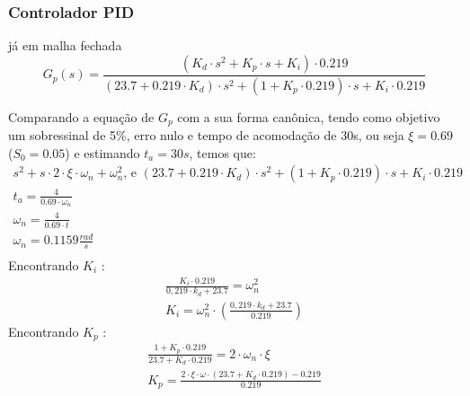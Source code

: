 \documentclass[
	article,			%
	11pt,				%
	oneside,			%
	a4paper,			%
	section=TITLE,		%
	english,			%
	brazil,				%
	sumario=tradicional
	]{abntex2}
\begin{document}
\subsubsection{Controlador PID}
 já em malha fechada
\begin{equation}
     G_p(s) = \frac{ (K_d \cdot s^2 + K_p \cdot s + K_i) \cdot 0.219 }{(23.7 + 0.219 \cdot K_d) \cdot s^2 + (1 + K_p \cdot 0.219) \cdot s  + K_i \cdot 0.219}
     \label{eq:planta-com-pi}
\end{equation}

    
    Comparando a equação de $G_p$ com a sua forma canônica, tendo como objetivo um sobressinal de 5\%, erro nulo e tempo de acomodação de 30s, ou seja $\xi = 0.69$ ($S_0 = 0.05$) e estimando $t_a = 30s$, temos que:
    \begin{equation} \begin{split}
        s^2 + s \cdot 2 \cdot \xi \cdot \omega_n + \omega_n^2  \text{, e   } %
        (23.7 + 0.219 \cdot K_d) \cdot s^2 + (1 + K_p \cdot 0.219) \cdot s  + K_i \cdot 0.219 \\
        t_a = \frac{4}{0.69 \cdot \omega_n} \\
        \omega_n = \frac{4}{0.69 \cdot t} \\
        \omega_n = 0.1159 \frac{rad}{s} \\
    \end{split} \end{equation}
    Encontrando $K_i$ : 
    \begin{equation} \begin{split}
        \frac{K_i \cdot 0.219}{0,219 \cdot k_d + 23.7} = \omega_n^2 \\
        K_i = \omega_n^2 \cdot \left( \frac{0,219 \cdot k_d + 23.7}{0.219} \right)
    \end{split} \end{equation}
        Encontrando $K_p$ :
    \begin{equation} \begin{split}
        \frac{1 + K_p \cdot 0.219}{23.7 + K_d \cdot 0.219} = 2 \cdot \omega_n \cdot \xi \\
        K_p =  \frac{2 \cdot \xi \cdot \omega \cdot (23.7 + K_d \cdot 0.219) - 0.219}{0.219} \\
    \end{split} \end{equation}
    
\end{document}
